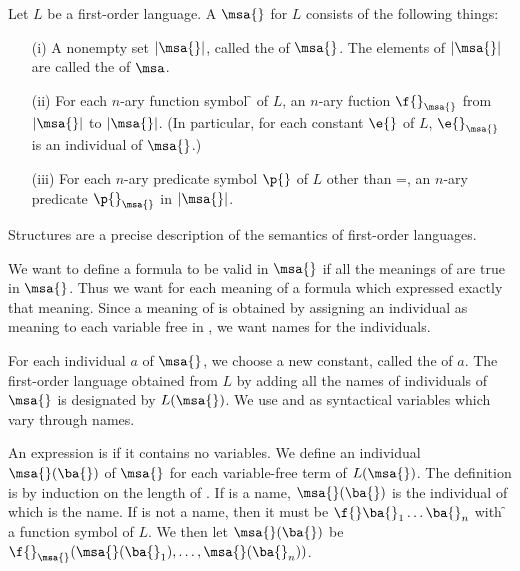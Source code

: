 \begin{shaded*}
    Let $L$ be a first-order language.
    A  $\msa{}$ for $L$ consists of the following things:
    \begin{enumerate}
        \item[(i)] A nonempty set $|\msa{}|$, called the  of $\msa{}$.
            The elements of $|\msa{}|$ are called the  of $\msa$.
        \item[(ii)] For each $n$-ary function symbol \f{} of $L$, an $n$-ary fuction $\f{}_\msa{}$ from $|\msa{}|$ to $|\msa{}|$.
            (In particular, for each constant $\e{}$ of $L$, $\e{}_\msa{}$ is an individual of $\msa{}$.)
        \item[(iii)] For each $n$-ary predicate symbol $\p{}$ of $L$ other than =, an $n$-ary predicate $\p{}_\msa{}$ in $|\msa{}|$.
    \end{enumerate}
\end{shaded*}

Structures are a precise description of the semantics of first-order languages.

We want to define a formula \A{} to be valid in $\msa{}$ if all the meanings of \A{} are true in $\msa{}$.
Thus we want for each meaning of \A{} a formula which expressed exactly that meaning.
Since a meaning of \A{} is obtained by assigning an individual as meaning to each variable free in \A{}, we want names for the individuals.

For each individual $a$ of $\msa{}$, we choose a new constant, called the  of $a$.
The first-order language obtained from $L$ by adding all the names of individuals of $\msa{}$ is designated by $L(\msa{})$.
We use \bi{} and \bj{} as syntactical variables which vary through names.

An expression is  if it contains no variables.
We define an individual $\msa{}(\ba{})$ of $\msa{}$ for each variable-free term \ba{} of $L(\msa{})$.
The definition is by induction on the length of \ba{}.
If \ba{} is a name, $\msa{}(\ba{})$ is the individual of which \ba{} is the name.
If \ba{} is not a name, then it must be $\f{} \ba{}_1 \dots \ba{}_n$ with \f{} a function symbol of $L$.
We then let $\msa{}(\ba{})$ be $\f{}_\msa{} (\msa{}(\ba{}_1), \dots, \msa{}(\ba{}_n))$.

